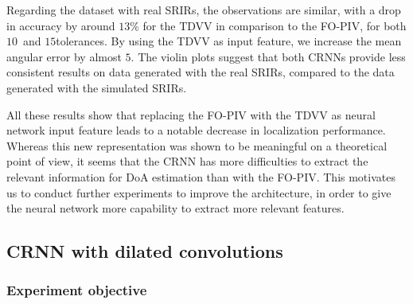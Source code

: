 Regarding the dataset with real SRIRs, the observations are similar, with a drop in accuracy by around $13$\% for the TDVV in comparison to the FO-PIV, for both  $10$\textdegree~and $15$\textdegree tolerances. By using the TDVV as input feature, we increase the mean angular error by almost $5$\textdegree. The violin plots suggest that both CRNNs provide less consistent results on data generated with the real SRIRs, compared to the data generated with the simulated SRIRs.

All these results show that replacing the FO-PIV with the TDVV as neural network input feature leads to a notable decrease in localization performance. Whereas this new representation was shown to be meaningful on a theoretical point of view, it seems that the CRNN has more difficulties to extract the relevant information for DoA estimation than with the FO-PIV. This motivates us to conduct further experiments to improve the architecture, in order to give the neural network more capability to extract more relevant features.

\subsection{CRNN with dilated convolutions}

\subsubsection{Experiment objective}

